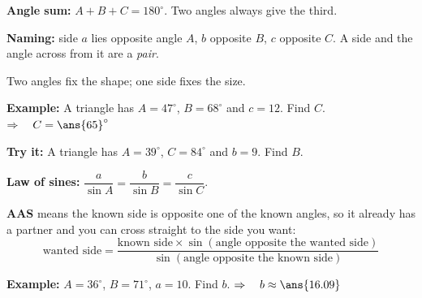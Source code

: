 \documentclass[12pt]{article}
\begin{document}


\begin{formulabox}
\textbf{Angle sum:} $A + B + C = 180^\circ$. Two angles always give the third.\par
\textbf{Naming:} side $a$ lies opposite angle $A$, $b$ opposite $B$, $c$ opposite $C$. A side and the angle across from it are a \emph{pair}.\par
Two angles fix the shape; one side fixes the size.
\end{formulabox}

\begin{examplebox}
\textbf{Example:} \quad A triangle has $A = 47^\circ$, $B = 68^\circ$ and $c = 12$. Find $C$.
$\Rightarrow\quad C = \ans{65}^\circ$
\end{examplebox}

\begin{tryitbox}
\textbf{Try it:} \quad A triangle has $A = 39^\circ$, $C = 84^\circ$ and $b = 9$. Find $B$.\\[2pt]
\end{tryitbox}


\begin{formulabox}
\textbf{Law of sines:} $\dfrac{a}{\sin A} = \dfrac{b}{\sin B} = \dfrac{c}{\sin C}$.\par
\textbf{AAS} means the known side is opposite one of the known angles, so it already has a partner and you can cross straight to the side you want:
\[ \text{wanted side} = \frac{\text{known side} \times \sin(\text{angle opposite the wanted side})}{\sin(\text{angle opposite the known side})} \]
\end{formulabox}

\begin{examplebox}
\textbf{Example:} \quad $A = 36^\circ$, $B = 71^\circ$, $a = 10$. Find $b$.
$\Rightarrow\quad b \approx \ans{16.09}$
\end{examplebox}
\end{document}
